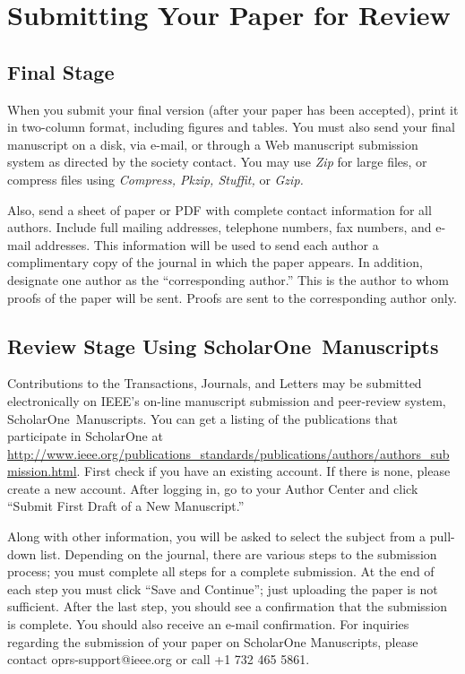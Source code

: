 \documentclass[journal,twoside,web]{ieeecolor}
\begin{document}
\section{Submitting Your Paper for Review}

\subsection{Final Stage}
When you submit your final version (after your paper has been accepted), 
print it in two-column format, including figures and tables. You must also 
send your final manuscript on a disk, via e-mail, or through a Web 
manuscript submission system as directed by the society contact. You may use 
\emph{Zip} for large files, or compress files using \emph{Compress, Pkzip, Stuffit,} or \emph{Gzip.} 

Also, send a sheet of paper or PDF with complete contact information for all 
authors. Include full mailing addresses, telephone numbers, fax numbers, and 
e-mail addresses. This information will be used to send each author a 
complimentary copy of the journal in which the paper appears. In addition, 
designate one author as the ``corresponding author.'' This is the author to 
whom proofs of the paper will be sent. Proofs are sent to the corresponding 
author only.

\subsection{Review Stage Using ScholarOne\textregistered\ Manuscripts}
Contributions to the Transactions, Journals, and Letters may be submitted 
electronically on IEEE's on-line manuscript submission and peer-review 
system, ScholarOne\textregistered\ Manuscripts. You can get a listing of the 
publications that participate in ScholarOne at 
\underline{http://www.ieee.org/publications\_standards/publications/}\discretionary{}{}{}\underline{authors/authors\_submission.html}.
First check if you have an existing account. If there is none, please create 
a new account. After logging in, go to your Author Center and click ``Submit 
First Draft of a New Manuscript.'' 

Along with other information, you will be asked to select the subject from a 
pull-down list. Depending on the journal, there are various steps to the 
submission process; you must complete all steps for a complete submission. 
At the end of each step you must click ``Save and Continue''; just uploading 
the paper is not sufficient. After the last step, you should see a 
confirmation that the submission is complete. You should also receive an 
e-mail confirmation. For inquiries regarding the submission of your paper on 
ScholarOne Manuscripts, please contact oprs-support@ieee.org or call +1 732 
465 5861.
\end{document}
